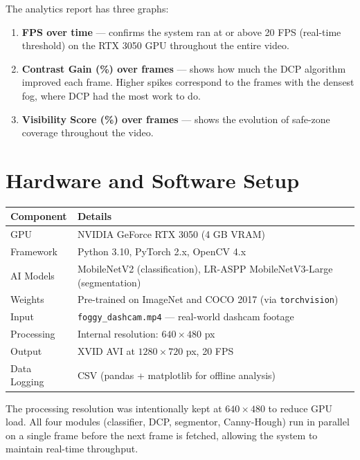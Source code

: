 \documentclass[12pt, a4paper]{article}
\begin{document}
The analytics report has three graphs:
\begin{enumerate}
  \item \textbf{FPS over time} — confirms the system ran at or above 20 FPS
  (real-time threshold) on the RTX 3050 GPU throughout the entire video.
  \item \textbf{Contrast Gain (\%) over frames} — shows how much the DCP
  algorithm improved each frame. Higher spikes correspond to the frames with
  the densest fog, where DCP had the most work to do.
  \item \textbf{Visibility Score (\%) over frames} — shows the evolution of
  safe-zone coverage throughout the video.
\end{enumerate}

\section{Hardware and Software Setup}

\begin{center}
\begin{tabular}{ll}
  \toprule
  \textbf{Component} & \textbf{Details}\\
  \midrule
  GPU          & NVIDIA GeForce RTX 3050 (4 GB VRAM)\\
  Framework    & Python 3.10, PyTorch 2.x, OpenCV 4.x\\
  AI Models    & MobileNetV2 (classification), LR-ASPP MobileNetV3-Large (segmentation)\\
  Weights      & Pre-trained on ImageNet and COCO 2017 (via \texttt{torchvision})\\
  Input        & \texttt{foggy\_dashcam.mp4} — real-world dashcam footage\\
  Processing   & Internal resolution: $640 \times 480$ px\\
  Output       & XVID AVI at $1280 \times 720$ px, 20 FPS\\
  Data Logging & CSV (pandas + matplotlib for offline analysis)\\
  \bottomrule
\end{tabular}
\end{center}

The processing resolution was intentionally kept at $640 \times 480$ to reduce
GPU load. All four modules (classifier, DCP, segmentor, Canny-Hough) run in
parallel on a single frame before the next frame is fetched, allowing the system
to maintain real-time throughput.
\end{document}
